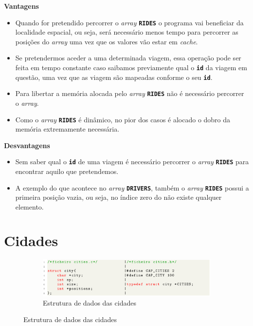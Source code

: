 \documentclass[12pt,a4paper]{report}
\begin{document}
\normalsize\textbf{Vantagens}
\begin{itemize}
   
    \item Quando for pretendido percorrer o \textit{array} \textbf{\small\texttt{RIDES}} o programa vai beneficiar da localidade espacial, ou 
    seja, será necessário menos tempo para percorrer as posições do \textit{array} uma vez que os valores vão estar em \textit{cache}.
    
    \item Se pretendermos aceder a uma determinada viagem, essa operação pode ser feita em tempo constante caso saibamos previamente qual o \textbf{\small\texttt{id}} da viagem em questão, uma vez que as viagem são mapeadas conforme o seu \textbf{\small\texttt{id}}.

    \item Para libertar a memória alocada pelo \textit{array} \textbf{\small\texttt{RIDES}} não é necessário percorrer o \textit{array}.

    \item Como o \textit{array} \textbf{\small\texttt{RIDES}} é dinâmico, no pior dos casos é alocado o dobro da memória extremamente necessária.
\end{itemize}

\normalsize\textbf{Desvantagens}
\begin{itemize}
    \item Sem saber qual o \textbf{\small\texttt{id}} de uma viagem é necessário percorrer o \textit{array} \textbf{\small\texttt{RIDES}} para encontrar aquilo que pretendemos.
    
    \item A exemplo do que acontece no \textit{array} \textbf{\small\texttt{DRIVERS}}, também o \textit{array} \textbf{\small\texttt{RIDES}} possui a primeira posição vazia, ou seja, no índice zero do não existe qualquer elemento.
\end{itemize}


\section{Cidades}

\begin{figure}[hbt!]
    \centering
    \begin{subfigure}{\textwidth}
        \centering
        \includegraphics[width=1\linewidth]{images/cities.png}
        \caption*{Estrutura de dados das cidades}
        \label{fig:cities}
    \end{subfigure}
\end{figure}
\end{document}
